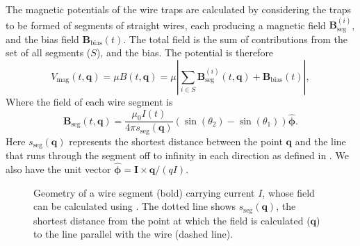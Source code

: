 The magnetic potentials of the wire traps are calculated by considering the
traps to be formed of segments of straight wires, each producing a magnetic
field $\mathbf{B}_\text{seg}^{(i)}$, and the bias field
$\mathbf{B}_\text{bias}(t)$.  The total field is the sum of contributions from
the set of all segments ($S$), and the bias. The potential is therefore
%
\begin{equation} V_\text{mag}(t, \mathbf{q}) = \mu B (t, \mathbf{q}) = \mu
\left| \sum_{i\in S} \mathbf{B}_\text{seg}^{(i)}(t, \mathbf{q}) +
\mathbf{B}_\text{bias}(t)\right|,  \end{equation}
%
Where the field of each wire segment is~\cite{Griffiths2017}
%
\begin{equation} \mathbf{B}_\text{seg}(t, \mathbf{q}) = \frac{\mu_0 I(t)}{4\pi
s_\text{seg}(\mathbf{q})} (\sin(\theta_2)  -
\sin(\theta_1))\hat{\mathbf{\phi}}. \label{design:eq:segmentfield}
\end{equation}
%
Here $s_\text{seg}(\mathbf{q})$ represents the shortest distance between the
point $\mathbf{q}$ and the line that runs through the segment off to infinity
in each direction as defined in . We also have
the unit vector $\hat{\mathbf{\phi}} = \mathbf{I}\times\mathbf{q}/(qI)$.

\begin{figure}[h]
\centering
  \caption{Geometry of a wire segment (bold) carrying current $I$, whose field
  can be calculated using . The dotted line
  shows $s_\text{seg}(\mathbf{q})$, the shortest distance from the point at
  which the field is calculated ($\mathbf{q}$) to the line parallel with the
  wire (dashed line).
  }
  \label{design:fig:wiresegment}
\end{figure}

